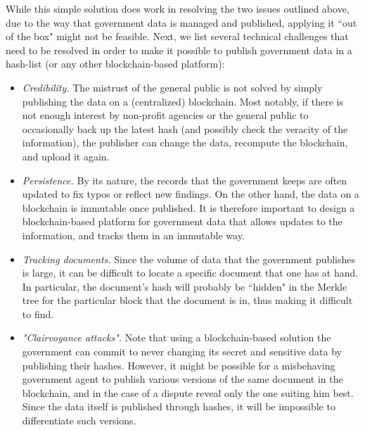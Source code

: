 While this simple solution does work in resolving the two issues outlined above, due to the way that government data is managed and published, applying it ``out of the box" might not be feasible. Next, we list several technical challenges that need to be resolved in order to make it possible to publish government data in a hash-list (or any other blockchain-based platform):
\begin{itemize}
\item {\it Credibility.} The mistrust of the general public is not solved by simply publishing the data on a (centralized) blockchain. Most notably, if there is not enough interest by non-profit agencies or the general public to occasionally back up the latest hash (and possibly check the veracity of the information), the publisher can change the data, recompute the blockchain, and upload it again. %
\item {\it Persistence.} By its nature, the records that the government keeps are often updated to fix typos or reflect new findings. On the other hand, the data on a blockchain is immutable once published. It is therefore important to design a blockchain-based platform for government data that allows updates to the information, and tracks them in an  immutable way.
\item {\it Tracking documents.} Since the volume of data that the government publishes is large, it can be difficult to locate a specific document that one has at hand. In particular, the document's hash will probably be ``hidden" in the Merkle tree for the particular block that the document is in, thus making it difficult to find.%
\item {\it "Clairvoyance attacks".} Note that using a blockchain-based solution the government can commit to never changing its secret and sensitive data by publishing their hashes. However, it might be possible for a misbehaving government agent to publish various versions of the same document in the blockchain, and in the case of a dispute reveal only the one suiting him best. Since the data itself is published through hashes, it will be impossible to differentiate such versions.
\end{itemize}


